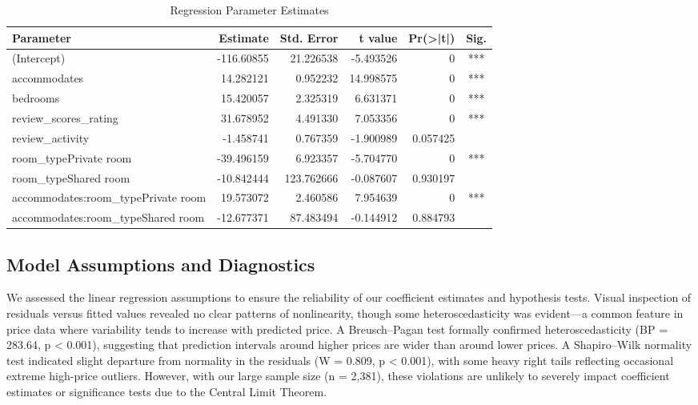 \documentclass[9pt,a4paper,onecolumn,twoside]{tau-class/tau}
\begin{document}
\begin{table}[htbp]
\centering
\caption{Regression Parameter Estimates}
\label{tab:params}
\begin{tabular}{lrrrrc}
\hline
Parameter & Estimate & Std. Error & t value & Pr(>|t|) & Sig. \\
\hline
(Intercept)                               & -116.60855 & 21.226538  &  -5.493526 & 0        & *** \\
accommodates                              &  14.282121 &  0.952232  &  14.998575 & 0        & *** \\
bedrooms                                  &  15.420057 &  2.325319  &   6.631371 & 0        & *** \\
review\_scores\_rating                    &  31.678952 &  4.491330  &   7.053356 & 0        & *** \\
review\_activity                          &  -1.458741 &  0.767359  &  -1.900989 & 0.057425 &     \\
room\_typePrivate room                    & -39.496159 &  6.923357  &  -5.704770 & 0        & *** \\
room\_typeShared room                     & -10.842444 & 123.762666 &  -0.087607 & 0.930197 &     \\
accommodates:room\_typePrivate room       &  19.573072 &  2.460586  &   7.954639 & 0        & *** \\
accommodates:room\_typeShared room        & -12.677371 & 87.483494  &  -0.144912 & 0.884793 &     \\
\hline
\end{tabular}
\end{table}

\subsection{Model Assumptions and Diagnostics}

We assessed the linear regression assumptions to ensure the reliability of our coefficient estimates and hypothesis tests. Visual inspection of residuals versus fitted values revealed no clear patterns of nonlinearity, though some heteroscedasticity was evident---a common feature in price data where variability tends to increase with predicted price. A Breusch--Pagan test formally confirmed heteroscedasticity (BP = 283.64, p < 0.001), suggesting that prediction intervals around higher prices are wider than around lower prices. A Shapiro--Wilk normality test indicated slight departure from normality in the residuals (W = 0.809, p < 0.001), with some heavy right tails reflecting occasional extreme high-price outliers. However, with our large sample size (n = 2,381), these violations are unlikely to severely impact coefficient estimates or significance tests due to the Central Limit Theorem.
\end{document}
